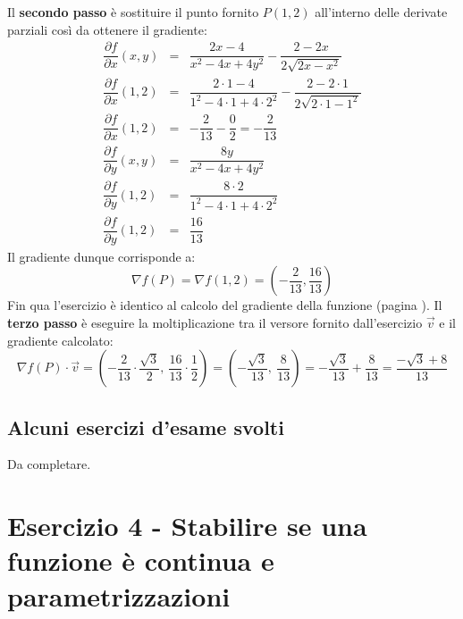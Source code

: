 \documentclass[a4paper]{article}
\begin{document}
	\noindent
	Il \textbf{secondo passo} è sostituire il punto fornito $P\left(1,2\right)$ all'interno delle derivate parziali così da ottenere il gradiente:
	\begin{equation*}
		\begin{array}{rcl}
			\dfrac{\partial f}{\partial x}\left(x,y\right) &=& \dfrac{2x - 4}{x^{2}-4x+4y^{2}} - \dfrac{2-2x}{2\sqrt{2x-x^{2}}} \\ [1.5em]
			\dfrac{\partial f}{\partial x}\left(1,2\right) &=& \dfrac{2 \cdot 1 - 4}{1^{2}-4 \cdot 1+4 \cdot 2^{2}} - \dfrac{2-2 \cdot 1}{2\sqrt{2 \cdot 1- 1^{2}}} \\ [1.5em]
			\dfrac{\partial f}{\partial x}\left(1,2\right) &=& -\dfrac{2}{13} - \dfrac{0}{2} = -\dfrac{2}{13} \\ [2.5em]
			\dfrac{\partial f}{\partial y}\left(x,y\right) &=& \dfrac{8y}{x^{2} - 4x + 4y^{2}} \\ [1.5em]
			\dfrac{\partial f}{\partial y}\left(1,2\right) &=& \dfrac{8 \cdot 2}{1^{2} - 4 \cdot 1 + 4 \cdot 2^{2}} \\ [1.5em]
			\dfrac{\partial f}{\partial y}\left(1,2\right) &=& \dfrac{16}{13}
		\end{array}
	\end{equation*}
	Il gradiente dunque corrisponde a:
	\begin{equation*}
		\nabla f\left(P\right) = \nabla f\left(1,2\right) = \left(-\dfrac{2}{13}, \dfrac{16}{13}\right)
	\end{equation*}
	Fin qua l'esercizio è identico al calcolo del gradiente della funzione (pagina \pageref{par: calcolare il gradiente della funzione}). Il \textbf{terzo passo} è eseguire la moltiplicazione tra il versore fornito dall'esercizio $\overrightarrow{v}$ e il gradiente calcolato:
	\begin{equation*}
		\nabla f\left(P\right) \cdot \overrightarrow{v} = \left(-\dfrac{2}{13} \cdot \dfrac{\sqrt{3}}{2}, \: \dfrac{16}{13} \cdot \dfrac{1}{2}\right) = \left(-\dfrac{\sqrt{3}}{13}, \: \dfrac{8}{13}\right) = -\dfrac{\sqrt{3}}{13} + \dfrac{8}{13} = \dfrac{-\sqrt{3} + 8}{13}
	\end{equation*}\newpage

	\subsection{Alcuni esercizi d'esame svolti}
	Da completare.\newpage

	\section{Esercizio 4 - Stabilire se una funzione è continua e parametrizzazioni}
\end{document}
